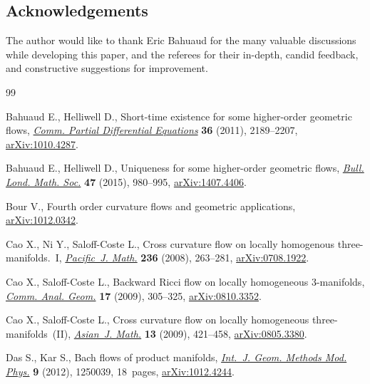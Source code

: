 \documentclass[pdftex]{sigma}
\numberwithin{equation}{section}
\begin{document}
\subsection*{Acknowledgements}

The author would like to thank Eric Bahuaud for the many valuable discussions while developing this paper, and the referees for their in-depth, candid feedback, and constructive suggestions for improvement.

\begin{thebibliography}{99}
\footnotesize\itemsep=0pt

Bahuaud E., Helliwell D., Short-time existence for some higher-order geometric
 flows, \href{https://doi.org/10.1080/03605302.2011.593015}{\textit{Comm. Partial Differential Equations}} \textbf{36} (2011), 2189--2207, \href{https://arxiv.org/abs/1010.4287}{arXiv:1010.4287}.

Bahuaud E., Helliwell D., Uniqueness for some higher-order geometric flows,
 \href{https://doi.org/10.1112/blms/bdv076}{\textit{Bull. Lond. Math. Soc.}} \textbf{47} (2015), 980--995,
 \href{https://arxiv.org/abs/1407.4406}{arXiv:1407.4406}.

Bour V., Fourth order curvature flows and geometric applications,
 \href{https://arxiv.org/abs/1012.0342}{arXiv:1012.0342}.

Cao X., Ni Y., Saloff-Coste L., Cross curvature flow on locally homogenous
 three-manifolds.~{I}, \href{https://doi.org/10.2140/pjm.2008.236.263}{\textit{Pacific~J. Math.}} \textbf{236} (2008),
 263--281, \href{https://arxiv.org/abs/0708.1922}{arXiv:0708.1922}.

Cao X., Saloff-Coste L., Backward {R}icci flow on locally homogeneous
 3-manifolds, \href{https://doi.org/10.4310/CAG.2009.v17.n2.a6}{\textit{Comm. Anal. Geom.}} \textbf{17} (2009), 305--325, \href{https://arxiv.org/abs/0810.3352}{arXiv:0810.3352}.

Cao X., Saloff-Coste L., Cross curvature flow on locally homogeneous
 three-manifolds~({II}), \href{https://doi.org/10.4310/AJM.2009.v13.n4.a1}{\textit{Asian~J. Math.}} \textbf{13} (2009), 421--458,
 \href{https://arxiv.org/abs/0805.3380}{arXiv:0805.3380}.

Das S., Kar S., Bach flows of product manifolds, \href{https://doi.org/10.1142/S0219887812500399}{\textit{Int.~J. Geom. Methods
 Mod. Phys.}} \textbf{9} (2012), 1250039, 18~pages, \href{https://arxiv.org/abs/1012.4244}{arXiv:1012.4244}.


\end{thebibliography}
\end{document}
